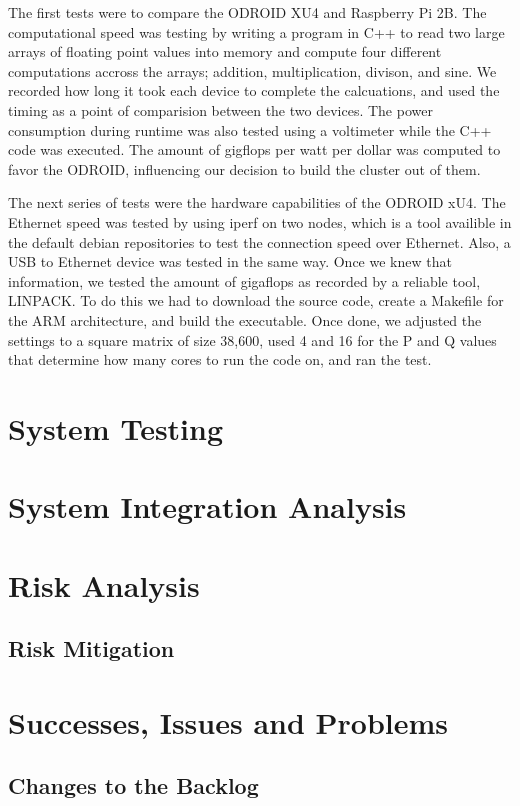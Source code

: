 The first tests were to compare the ODROID XU4 and Raspberry Pi 2B. The computational speed was testing by writing a program in C++ to read two large arrays of floating point values into memory and compute four different computations accross the arrays; addition, multiplication, divison, and sine. We recorded how long it took each device to complete the calcuations, and used the timing as a point of comparision between the two devices. The power consumption during runtime was also tested using a voltimeter while the C++ code was executed. The amount of gigflops per watt per dollar was computed to favor the ODROID, influencing our decision to build the cluster out of them.

The next series of tests were the hardware capabilities of the ODROID xU4. The Ethernet speed was tested by using iperf on two nodes, which is a tool availible in the default debian repositories to test the connection speed over Ethernet. Also, a USB to Ethernet device was tested in the same way. Once we knew that information, we tested the amount of gigaflops as recorded by a reliable tool, LINPACK. To do this we had to download the source code, create a Makefile for the ARM architecture, and build the executable. Once done, we adjusted the settings to a square matrix of size 38,600, used 4 and 16 for the P and Q values that determine how many cores to run the code on, and ran the test.

\section{System Testing}

\section{System Integration Analysis}

\section{Risk Analysis}

\subsection{Risk Mitigation}

\section{Successes, Issues and Problems}

\subsection{Changes to the Backlog}

